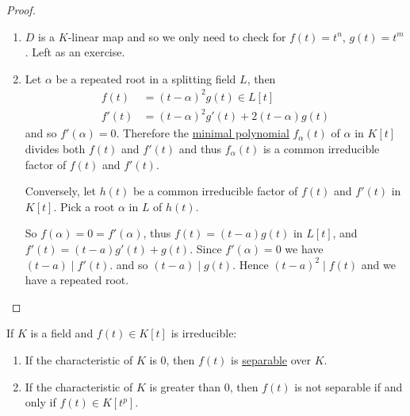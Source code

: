 \documentclass{article}
\begin{document}
\begin{proof}
    \leavevmode
    \begin{enumerate}[label=(\alph*)]
        \item \hyperlink{def:diff}{$D$} is a $K$-linear map and so we only need to check for $f(t) = t^n$, $g(t) = t^m$. Left as an exercise.
        \item Let $\alpha$ be a repeated root in a splitting field $L$, then
            \begin{align*}
                f(t) &= (t-\alpha)^2 g(t) \in L[t] \\
                f'(t) &= (t-\alpha)^2 g'(t) + 2(t-\alpha) g(t)
            \end{align*}
            and so $f'(\alpha) = 0$.
            Therefore the \hyperlink{def:minimalPoly}{minimal polynomial} $f_\alpha(t)$ of $\alpha$ in $K[t]$ divides both $f(t)$ and $f'(t)$ and thus $f_\alpha(t)$ is a common irreducible factor of $f(t)$ and $f'(t)$.


            Conversely, let $h(t)$ be a common irreducible factor of $f(t)$ and $f'(t)$ in $K[t]$.
            Pick a root $\alpha$ in $L$ of $h(t)$.

            So $f(\alpha) = 0 = f'(\alpha)$, thus $f(t) = (t-a) g(t)$ in $L[t]$, and $f'(t) = (t-a) g'(t) + g(t)$.
            Since $f'(\alpha)  = 0$ we have $(t-a) \mid f'(t)$. and so $(t-a) \mid g(t)$. Hence $(t-a)^2 \mid f(t)$ and we have a repeated root. \qedhere
    \end{enumerate}
\end{proof}

\begin{ncor}\label{cor:2.4}
    If $K$ is a field and $f(t) \in K[t]$ is irreducible:
    \begin{enumerate}[label=(\roman*)]
        \item If the characteristic of $K$ is 0, then $f(t)$ is \hyperlink{def:separablePoly}{separable} over $K$.
        \item If the characteristic of $K$ is greater than 0, then $f(t)$ is not separable if and only if $f(t) \in K[t^p]$.
    \end{enumerate}
\end{ncor}
\end{document}
